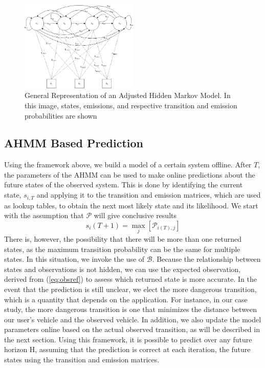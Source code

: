 \documentclass[conference]{IEEEtran}
\begin{document}
\begin{figure}[ht]
    \includegraphics[width=0.5\textwidth]{ahmm.png}
    \caption{General Representation of an Adjusted Hidden Markov Model. In this image, states, emissions, and respective transition and emission probabilities are shown}
    \label{fig:hmm}
\end{figure}

\subsection{AHMM Based Prediction}
 Using the framework above, we build a model of a certain system offline. After $T$, the parameters of the AHMM can be used to make online predictions about the future states of the observed system. This is done by identifying the current state, $s_{i,T}$ and applying it to the transition and emission matrices, which are used as lookup tables, to obtain the next most likely state and its likelihood. We start with the assumption that $\mathcal{P}$ will give conclusive results
\begin{equation} \label{eq:nextstate}
    s_{i}(T+1) = \max_{j}[\mathcal{P}_{i(T),j}]
\end{equation}
There is, however, the possibility that there will be more than one returned states, as the maximum transition probability can be the same for multiple states. In this situation, we invoke the use of $\mathcal{B}$. Because the relationship between states and observations is not hidden, we can use the expected observation, derived from (\ref{eq:obsref}) to assess which returned state is more accurate. In the event that the prediction is still unclear, we elect the more dangerous transition, which is a quantity that depends on the application. For instance, in our case study, the more dangerous transition is one that minimizes the distance between our user's vehicle and the observed vehicle. In addition, we also update the model parameters online based on the actual observed transition, as will be described in the next section. Using this framework, it is possible to predict over any future horizon H, assuming that the prediction is correct at each iteration, the future states using the transition and emission matrices.
\end{document}
